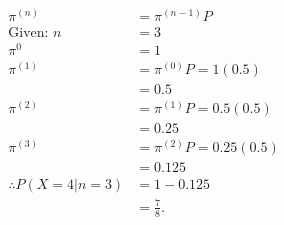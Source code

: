 \begin{align*}
	\pi^{(n)} &= \pi^{(n-1)}P \\
	\text{Given: } n &= 3 \\
	\pi^{0} &= 1 \\
	\pi^{(1)} &= \pi^{(0)}P  = 1(0.5) \\
		  &= 0.5 \\
	\pi^{(2)} &= \pi^{(1)}P = 0.5(0.5) \\
		&= 0.25 \\
	\pi^{(3)} &= \pi^{(2)}P = 0.25(0.5) \\
		  &= 0.125 \\
	\therefore P(X=4 | n=3 ) &= 1-0.125 \\
				 &= \frac{7}{8}
.\end{align*}

